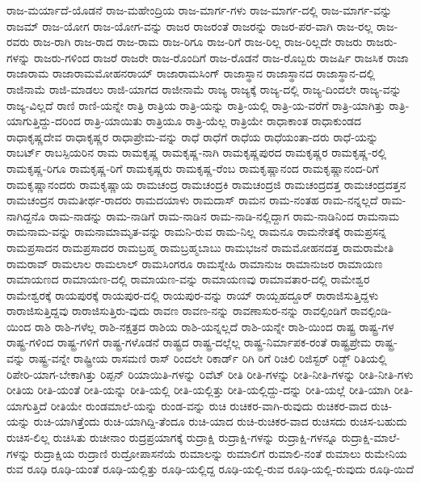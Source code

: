 {ರಾಜ-ಮರ್ಯಾದೆ-ಯೊಡನೆ
ರಾಜ-ಮಹೇಂದ್ರಿಯ
ರಾಜ-ಮಾರ್ಗ-ಗಳು
ರಾಜ-ಮಾರ್ಗ-ದಲ್ಲಿ
ರಾಜ-ಮಾರ್ಗ-ವನ್ನು
ರಾಜಮ್
ರಾಜ-ಯೋಗ
ರಾಜ-ಯೋಗ-ವನ್ನು
ರಾಜರ
ರಾಜರಂತೆ
ರಾಜರನ್ನು
ರಾಜರ-ಪರ-ವಾಗಿ
ರಾಜ-ರಲ್ಲ
ರಾಜ-ರವರು
ರಾಜ-ರಾಗಿ
ರಾಜ-ರಾದ
ರಾಜ-ರಾಮ
ರಾಜ-ರಿಗೂ
ರಾಜ-ರಿಗೆ
ರಾಜ-ರಿಲ್ಲ
ರಾಜ-ರಿಲ್ಲದೇ
ರಾಜರು
ರಾಜರು-ಗಳನ್ನು
ರಾಜರು-ಗಳಿಂದ
ರಾಜರೆ
ರಾಜರೇ
ರಾಜ-ರೊಂದಿಗೆ
ರಾಜ-ರೊಡನೆ
ರಾಜ-ರೊಬ್ಬರು
ರಾಜರ್ಷಿ
ರಾಜಸಿಕ
ರಾಜಾ
ರಾಜಾರಾಮ
ರಾಜಾರಾಮಮೋಹನರಾಯ್
ರಾಜಾರಾಮಸಿಂಗ್
ರಾಜಾಸ್ಥಾನ
ರಾಜಾಸ್ಥಾನದ
ರಾಜಾಸ್ಥಾನ-ದಲ್ಲಿ
ರಾಜಿನಾಮೆ
ರಾಜಿ-ಮಾಡಲು
ರಾಜಿ-ಯಾಗದ
ರಾಜೀನಾಮೆ
ರಾಜ್ಯ
ರಾಜ್ಯಕ್ಕೆ
ರಾಜ್ಯ-ದಲ್ಲಿ
ರಾಜ್ಯ-ದಿಂದಲೇ
ರಾಜ್ಯ-ವನ್ನು
ರಾಜ್ಯ-ವಿಲ್ಲದೆ
ರಾಣಿ
ರಾಣಿ-ಯನ್ನೇ
ರಾತ್ರಿ
ರಾತ್ರಿಯ
ರಾತ್ರಿ-ಯನ್ನು
ರಾತ್ರಿ-ಯಲ್ಲಿ
ರಾತ್ರಿ-ಯ-ವರೆಗೆ
ರಾತ್ರಿ-ಯಾಗಿತ್ತು
ರಾತ್ರಿ-ಯಾಗುತ್ತಿದ್ದು-ದರಿಂದ
ರಾತ್ರಿ-ಯಾಯಿತು
ರಾತ್ರಿಯೂ
ರಾತ್ರಿ-ಯೆಲ್ಲ
ರಾತ್ರಿಯೇ
ರಾಧಾಕಾಂತ
ರಾಧಾಕುಂಡದ
ರಾಧಾಕೃಷ್ಣದೇವ
ರಾಧಾಕೃಷ್ಣರ
ರಾಧಾಪ್ರೇಮ-ವನ್ನು
ರಾಧೆ
ರಾಧೆಗೆ
ರಾಧೆಯ
ರಾಧೆಯಂತಾ-ದರು
ರಾಧೆ-ಯನ್ನು
ರಾಬರ್ಟ್
ರಾಬಸ್ಪಿಯರಿನ
ರಾಮ
ರಾಮಕೃಷ್ಣ
ರಾಮಕೃಷ್ಣ-ನಾಗಿ
ರಾಮಕೃಷ್ಣಪುರದ
ರಾಮಕೃಷ್ಣರ
ರಾಮಕೃಷ್ಣ-ರಲ್ಲಿ
ರಾಮಕೃಷ್ಣ-ರಿಗೂ
ರಾಮಕೃಷ್ಣ-ರಿಗೆ
ರಾಮಕೃಷ್ಣರು
ರಾಮಕೃಷ್ಣ-ರೆಂಬ
ರಾಮಕೃಷ್ಣಾನಂದ
ರಾಮಕೃಷ್ಣಾನಂದ-ರಿಗೆ
ರಾಮಕೃಷ್ಣಾನಂದರು
ರಾಮಕೃಷ್ಣಾಯ
ರಾಮಚಂದ್ರ
ರಾಮಚಂದ್ರಕಿ
ರಾಮಚಂದ್ರಜಿ
ರಾಮಚಂದ್ರದತ್ತ
ರಾಮಚಂದ್ರದತ್ತನ
ರಾಮಚಂದ್ರನ
ರಾಮತೀರ್ಥ-ರಾದರು
ರಾಮದಯಾಳು
ರಾಮದಾಸ್
ರಾಮನ
ರಾಮ-ನಂತಹ
ರಾಮ-ನನ್ನಲ್ಲದೆ
ರಾಮ-ನಾಗಿದ್ದನೊ
ರಾಮ-ನಾಡನ್ನು
ರಾಮ-ನಾಡಿಗೆ
ರಾಮ-ನಾಡಿನ
ರಾಮ-ನಾಡಿ-ನಲ್ಲಿದ್ದಾಗ
ರಾಮ-ನಾಡಿನಿಂದ
ರಾಮನಾಮ
ರಾಮನಾಮ-ವನ್ನು
ರಾಮನಾಮಾಮೃತ-ವನ್ನು
ರಾಮನಿ-ರುವ
ರಾಮ-ನಿಲ್ಲ
ರಾಮನೂ
ರಾಮನೇತಕ್ಕೆ
ರಾಮಪ್ರಸನ್ನ
ರಾಮಪ್ರಸಾದನ
ರಾಮಪ್ರಸಾದರ
ರಾಮಬ್ರಹ್ಮ
ರಾಮಬ್ರಹ್ಮಬಾಬು
ರಾಮಭಜನೆ
ರಾಮಮೋಹನದತ್ತ
ರಾಮರಾಮೇತಿ
ರಾಮರಾವ್
ರಾಮಲಾಲ
ರಾಮಲಾಲ್
ರಾಮಸಿಂಗರೂ
ರಾಮಸ್ನೇಹಿ
ರಾಮಾನುಜ
ರಾಮಾನುಜರ
ರಾಮಾಯಣ
ರಾಮಾಯಣದ
ರಾಮಾಯಣ-ದಲ್ಲಿ
ರಾಮಾಯಣ-ವನ್ನು
ರಾಮಾಯಣವು
ರಾಮಾವತಾರ-ದಲ್ಲಿ
ರಾಮೇಶ್ವರ
ರಾಮೇಶ್ವರಕ್ಕೆ
ರಾಯಪುರಕ್ಕೆ
ರಾಯಪುರ-ದಲ್ಲಿ
ರಾಯಪುರ-ವನ್ನು
ರಾಯ್
ರಾಯ್ಬಹದ್ದೂರ್
ರಾರಾಜಿಸುತ್ತಿದ್ದಳು
ರಾರಾಜಿಸುತ್ತಿದ್ದವು
ರಾರಾಜಿಸುತ್ತಿರು-ವುದು
ರಾವಣ
ರಾವಣ-ನನ್ನು
ರಾವಣಾಸುರ-ನನ್ನು
ರಾವಲ್ಪಿಂಡಿಗೆ
ರಾವಲ್ಪಿಂಡಿ-ಯಿಂದ
ರಾಶಿ
ರಾಶಿ-ಗಳೆಲ್ಲ
ರಾಶಿ-ನಕ್ಷತ್ರದ
ರಾಶಿಯ
ರಾಶಿ-ಯನ್ನಲ್ಲದೆ
ರಾಶಿ-ಯನ್ನೇ
ರಾಶಿ-ಯಿಂದ
ರಾಷ್ಟ್ರ
ರಾಷ್ಟ್ರ-ಗಳ
ರಾಷ್ಟ್ರ-ಗಳಿಂದ
ರಾಷ್ಟ್ರ-ಗಳಿಗೆ
ರಾಷ್ಟ್ರ-ಗಳೊಡನೆ
ರಾಷ್ಟ್ರದ
ರಾಷ್ಟ್ರ-ದಲ್ಲೆಲ್ಲ
ರಾಷ್ಟ್ರ-ನಿರ್ಮಾಪಕ-ರಂತೆ
ರಾಷ್ಟ್ರಪ್ರೇಮ
ರಾಷ್ಟ್ರ-ವನ್ನು
ರಾಷ್ಟ್ರ-ವನ್ನೇ
ರಾಷ್ಟ್ರೀಯ
ರಾಸಮಣಿ
ರಾಸ್
ರಿಂದಲೇ
ರಿಕಾರ್ಡ್
ರಿಗಿ
ರಿಗೆ
ರಿಚಿಲಿ
ರಿಜಿಸ್ಟರ್
ರಿಡ್ಜ್
ರಿತಿಯಲ್ಲಿ
ರಿಪೇರಿ-ಯಾಗ-ಬೇಕಾಗಿತ್ತು
ರಿಪ್ಪನ್
ರಿಯಾಯಿತಿ-ಗಳನ್ನು
ರಿವೆಟ್
ರೀತಿ
ರೀತಿ-ಗಳನ್ನು
ರೀತಿ-ನೀತಿ-ಗಳನ್ನು
ರೀತಿ-ನೀತಿ-ಗಳು
ರೀತಿಯ
ರೀತಿ-ಯಂತೆ
ರೀತಿ-ಯನ್ನು
ರೀತಿ-ಯಲ್ಲಿ
ರೀತಿ-ಯಲ್ಲಿತ್ತು
ರೀತಿ-ಯಲ್ಲಿದ್ದು-ದನ್ನು
ರೀತಿ-ಯಲ್ಲೆ
ರೀತಿ-ಯಾಗಿ
ರೀತಿ-ಯಾಗುತ್ತಿದೆ
ರೀತಿಯೇ
ರುಂಡಮಾಲೆ-ಯನ್ನು
ರುಂಡ-ವನ್ನು
ರುಚಿ
ರುಚಿಕರ-ವಾಗಿ-ರುವುದು
ರುಚಿಕರ-ವಾದ
ರುಚಿ-ಯನ್ನು
ರುಚಿ-ಯಾಗಿತ್ತೆಂದು
ರುಚಿ-ಯಾಗಿದ್ದಿ-ತೆಂದೂ
ರುಚಿ-ಯಾದ
ರುಚಿ-ರುಚಿಕರ-ವಾದ
ರುಚಿಸದು
ರುಚಿಸ-ಬಹುದು
ರುಚಿಸ-ಲಿಲ್ಲ
ರುಚಿಸಿತು
ರುಚೀನಾಂ
ರುದ್ರಪ್ರಯಾಗಕ್ಕೆ
ರುದ್ರಾಕ್ಷಿ
ರುದ್ರಾಕ್ಷಿ-ಗಳನ್ನು
ರುದ್ರಾಕ್ಷಿ-ಗಳನ್ನೂ
ರುದ್ರಾಕ್ಷಿ-ಮಾಲೆ-ಗಳನ್ನು
ರುದ್ರಾಕ್ಷಿಯ
ರುದ್ರಾಣಿ
ರುದ್ರೋಪಾಸನೆಯೆ
ರುಮಾಲನ್ನು
ರುಮಾಲಿಗೆ
ರುಮಾಲಿ-ನಂತೆ
ರುಮಾಲು
ರುಮೇನಿಯ
ರುವ
ರೂಢಿ
ರೂಢಿ-ಯಂತೆ
ರೂಢಿ-ಯಲ್ಲಿತ್ತು
ರೂಢಿ-ಯಲ್ಲಿದ್ದ
ರೂಢಿ-ಯಲ್ಲಿ-ರುವ
ರೂಢಿ-ಯಲ್ಲಿ-ರುವುದು
ರೂಢಿ-ಯಿದೆ
}
